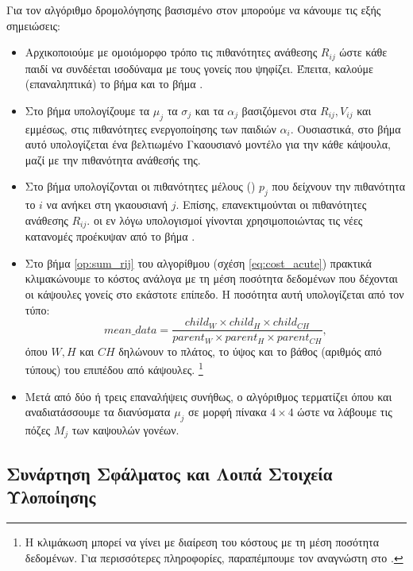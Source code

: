Για τον αλγόριθμο δρομολόγησης βασισμένο στον  μπορούμε να κάνουμε τις εξής σημειώσεις:
\begin{itemize}
  \item Αρχικοποιούμε με ομοιόμορφο τρόπο τις πιθανότητες ανάθεσης $R_{ij}$ ώστε κάθε παιδί να συνδέεται ισοδύναμα με τους γονείς που ψηφίζει. Έπειτα, καλούμε (επαναληπτικά) το βήμα  και το βήμα .
  \item Στο βήμα  υπολογίζουμε τα $\mu_j$ τα $\sigma_j$ και τα $\alpha_j$ βασιζόμενοι στα $R_{ij}, V_{ij}$ και εμμέσως, στις πιθανότητες ενεργοποίησης των παιδιών $\alpha_i$. Ουσιαστικά, στο βήμα αυτό υπολογίζεται ένα βελτιωμένο Γκαουσιανό μοντέλο για την κάθε κάψουλα, μαζί με την πιθανότητα ανάθεσής της. 
  \item Στο βήμα  υπολογίζονται οι πιθανότητες μέλους () $p_j$ που δείχνουν την πιθανότητα το  $i$ να ανήκει στη γκαουσιανή $j$. Επίσης, επανεκτιμούνται οι πιθανότητες ανάθεσης $R_{ij}$. οι εν λόγω υπολογισμοί γίνονται χρησιμοποιώντας τις νέες κατανομές προέκυψαν από το βήμα .
  \item Στο βήμα \ref{op:sum_rij} του αλγορίθμου (σχέση \ref{eq:cost_acute}) πρακτικά κλιμακώνουμε το κόστος ανάλογα με τη μέση ποσότητα δεδομένων που δέχονται οι κάψουλες γονείς στο εκάστοτε επίπεδο. Η ποσότητα αυτή υπολογίζεται από τον τύπο:
  \begin{equation}
    mean\_data = \frac{child_W \times child_H \times child_{CH}}{parent_W \times parent_H \times parent_{CH}},
  \end{equation}
  όπου $W, H$ και $CH$ δηλώνουν το πλάτος, το ύψος και το βάθος (αριθμός από τύπους) του επιπέδου από κάψουλες. \footnote{Η κλιμάκωση μπορεί να γίνει με διαίρεση του κόστους με τη μέση ποσότητα δεδομένων. Για περισσότερες πληροφορίες, παραπέμπουμε τον αναγνώστη στο \cite{gritzman2019avoiding}.}
  \item Μετά από δύο ή τρεις επαναλήψεις συνήθως, ο αλγόριθμος τερματίζει όπου και αναδιατάσσουμε τα διανύσματα $\mu_j$ σε μορφή πίνακα $4 \times 4$ ώστε να λάβουμε τις πόζες $M_j$ των καψουλών γονέων.
\end{itemize}

\subsection{Συνάρτηση Σφάλματος και Λοιπά Στοιχεία Υλοποίησης}

